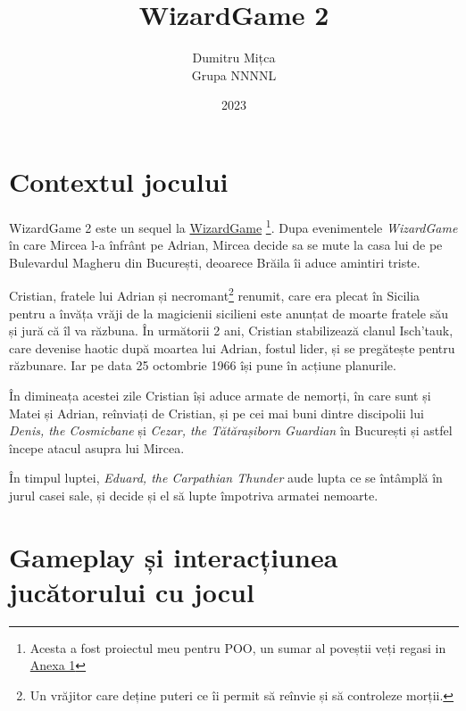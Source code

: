 \documentclass{article}
\title{\textbf{WizardGame 2}}
\author{
    Dumitru Mițca\\
    Grupa NNNNL}
\date{2023}
\begin{document}
    \maketitle

    \hypersetup{linkbordercolor=1 1 1}
    \renewcommand*\contentsname{Cuprins}
    \tableofcontents
    \hypersetup{linkbordercolor=1 0 0}


    \newpage

    \section{Contextul jocului}
    WizardGame 2 este un sequel la \href{https://github.com/RealKC/WizardGame}{WizardGame}
    \footnote{Acesta a fost proiectul meu pentru POO, un sumar al poveștii veți
    regasi in \href{sec:anexa1}{Anexa 1}}.
    Dupa evenimentele \emph{WizardGame} în care Mircea l-a înfrânt pe Adrian, Mircea decide sa se
    mute la casa lui de pe Bulevardul Magheru din București, deoarece Brăila îi aduce amintiri
    triste.

    Cristian, fratele lui Adrian și necromant\footnote{Un vrăjitor care deține puteri ce
    îi permit să reînvie și să controleze morții.} renumit, care era plecat în Sicilia
    pentru a învăța vrăji de la magicienii sicilieni este anunțat de moarte fratele său
    și jură că îl va răzbuna. În următorii 2 ani, Cristian stabilizează clanul Isch'tauk,
    care devenise haotic după moartea lui Adrian, fostul lider, și se pregătește pentru
    răzbunare. Iar pe data 25 octombrie 1966 își pune în acțiune planurile.

    În dimineața acestei zile Cristian își aduce armate de nemorți, în care sunt și Matei
    și Adrian, reînviați de Cristian, și pe cei mai buni dintre discipolii lui \emph{Denis,
    the Cosmicbane} și \emph{Cezar, the Tătărașiborn Guardian} în București și astfel
    începe atacul asupra lui Mircea.

    În timpul luptei, \emph{Eduard, the Carpathian Thunder} aude lupta ce se întâmplă în jurul
    casei sale, și decide și el să lupte împotriva armatei nemoarte.

    \section{Gameplay și interacțiunea jucătorului cu jocul}
\end{document}
